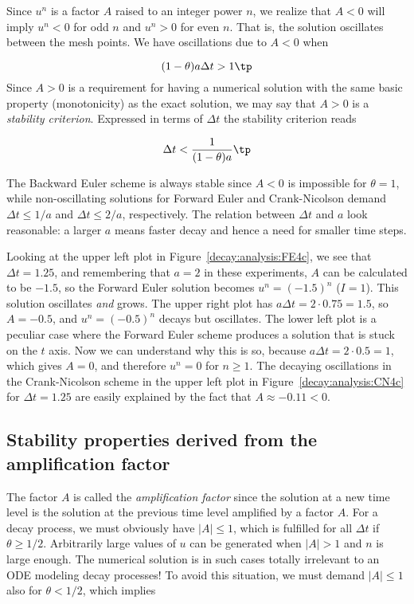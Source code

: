 \documentclass[graybox,sectrefs,envcountresetchap,open=right,final]{svmonodo}
\begin{document}

Since $u^n$ is a factor $A$
raised to an integer power $n$, we realize that $A < 0$
will imply $u^n < 0$ for odd $n$ and $u^n > 0$ for even $n$.
That is, the solution oscillates between the mesh points.
We have oscillations due to $A < 0$ when

\begin{equation}
(1-\theta)a\Delta t > 1 \tp
\label{decay:th:stability}
\end{equation}
Since $A>0$ is a requirement for having a numerical solution with the
same basic property (monotonicity) as the exact solution, we may say
that $A>0$ is a \emph{stability criterion}. Expressed in terms of $\Delta t$
the stability criterion reads

\begin{equation}
\Delta t < \frac{1}{(1-\theta)a}\tp
\end{equation}

The Backward
Euler scheme is always stable since $A < 0$ is impossible for $\theta=1$, while
non-oscillating solutions for Forward Euler and Crank-Nicolson
demand $\Delta t\leq 1/a$ and $\Delta t\leq 2/a$, respectively.
The relation between $\Delta t$ and $a$ look reasonable: a larger
$a$ means faster decay and hence a need for smaller time steps.

Looking at the upper left plot in Figure~\ref{decay:analysis:FE4c},
we see that $\Delta t=1.25$, and remembering that $a=2$ in these
experiments, $A$ can be calculated to be
$-1.5$, so the Forward Euler solution becomes $u^n=(-1.5)^n$ ($I=1$).
This solution oscillates \emph{and} grows. The upper right plot has
$a\Delta t = 2\cdot 0.75=1.5$, so $A=-0.5$,
and $u^n=(-0.5)^n$ decays but oscillates. The lower left plot
is a peculiar case where the Forward Euler scheme produces a solution
that is stuck on the $t$ axis. Now we can understand why this is so,
because $a\Delta t= 2\cdot 0.5=1$, which gives $A=0$,
and therefore $u^n=0$ for $n\geq 1$.  The decaying oscillations in the Crank-Nicolson scheme in the upper left plot in Figure~\ref{decay:analysis:CN4c}
for $\Delta t=1.25$ are easily explained by the fact that $A\approx -0.11 < 0$.


\subsection{Stability properties derived from the amplification factor}

The factor $A$ is called the \emph{amplification factor} since the solution
at a new time level is the solution at the previous time
level amplified by a factor $A$.
For a decay process, we must obviously have $|A|\leq 1$, which
is fulfilled for all $\Delta t$ if $\theta \geq 1/2$. Arbitrarily
large values of $u$ can be generated when $|A|>1$ and $n$ is large
enough. The numerical solution is in such cases totally irrelevant to
an ODE modeling decay processes! To avoid this situation, we must
demand $|A|\leq 1$ also for $\theta < 1/2$, which implies
\end{document}
